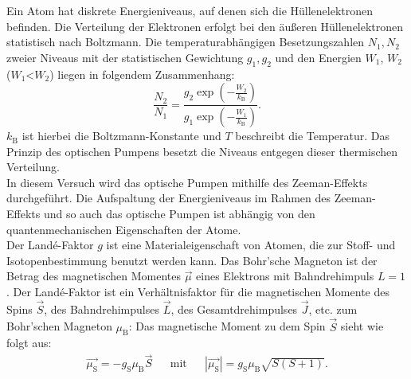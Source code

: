 %
Ein Atom hat diskrete Energieniveaus, auf denen sich die Hüllenelektronen befinden.
Die Verteilung der Elektronen erfolgt bei den äußeren Hüllenelektronen statistisch nach Boltzmann.
Die temperaturabhängigen Besetzungszahlen $N_{1}, N_{2}$ zweier Niveaus mit der statistischen Gewichtung $g_{1}, g_{2}$ und den Energien $W_{1}$, $W_{2}$ ($W_{1}$<$W_{2}$) liegen in folgendem Zusammenhang:
\begin{equation*}
  \frac{N_{2}}{N_{1}} = \frac{ g_{2} \exp{  \left( -\frac{W_{2}}{k_{\text{B}}}  \right) }}{ g_{1} \exp{ \left( -\frac{W_{1}}{k_{\text{B}}} \right) }}.
\end{equation*}
$k_{\text{B}}$ ist hierbei die Boltzmann-Konstante und $T$ beschreibt die Temperatur.
Das Prinzip des optischen Pumpens besetzt die Niveaus entgegen dieser thermischen Verteilung.\\
In diesem Versuch wird das optische Pumpen mithilfe des Zeeman-Effekts durchgeführt.
Die Aufspaltung der Energieniveaus im Rahmen des Zeeman-Effekts und so auch das optische Pumpen ist abhängig von den quantenmechanischen Eigenschaften der Atome.
%
%
\\Der Landé-Faktor $g$ ist eine Materialeigenschaft von Atomen, die zur Stoff- und Isotopenbestimmung benutzt werden kann.
Das Bohr'sche Magneton ist der Betrag des magnetischen Momentes $\vec{\mu}$ eines Elektrons mit Bahndrehimpuls $L=1$.
Der Landé-Faktor ist ein Verhältnisfaktor für die magnetischen Momente des Spins $\vec{S}$, des Bahndrehimpulses $\vec{L}$, des Gesamtdrehimpulses $\vec{J}$, etc. zum Bohr'schen Magneton $\mu_{\text{B}}$:
Das magnetische Moment zu dem Spin $\vec{S}$ sieht wie folgt aus:
\begin{align*}
  \vec{\mu_{\text{S}}} = - g_{\text{S}} \mu_{\text{B}} \vec{S} && \text{mit} && |\vec{\mu_{\text{S}}}|= g_{\text{S}} \mu_{\text{B}} \sqrt{S(S+1)}.\\
\end{align*}
